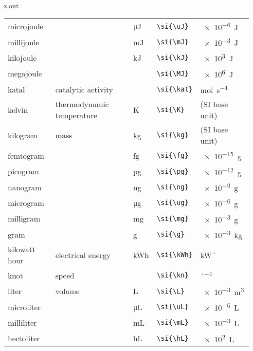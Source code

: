 \begin{VerbatimOut}{z.out}
{\begin{longtable}{@{}P{1.4in}P{1in}llP{1.8in}@{}}
    \quad microjoule&
      \ditto&
      \si{\uJ}&
      \verb+\si{\uJ}+&
      \SI{e-6}{\J}\\
    \quad millijoule&
      \ditto&
      \si{\mJ}&
      \verb+\si{\mJ}+&
      \SI{e-3}{\J}\\
    \quad kilojoule&
      \ditto&
      \si{\kJ}&
      \verb+\si{\kJ}+&
      \SI{e3}{\J}\\
    \quad megajoule&
      \ditto&
      \si{\MJ}&
      \verb+\si{\MJ}+&
      \SI{e6}{\J}\\
    \vsp
    katal&
      catalytic activity&
      \si{\kat}&
      \verb+\si{\kat}+&
      \si{\mol\per\s}\\
    \vsp
    kelvin&
      thermodynamic temperature&
      \si{\K}&
      \verb+\si{\K}+&
      (SI base unit)\\
    \vsp
    kilogram&
      mass&
      \si{\kg}&
      \verb+\si{\kg}+&
      (SI base unit)\\
    \quad femtogram&
      \ditto&
      \si{\fg}&
      \verb+\si{\fg}+&
      \SI{e-15}{\g}\\
    \quad picogram&
      \ditto&
      \si{\pg}&
      \verb+\si{\pg}+&
      \SI{e-12}{\g}\\
    \quad nanogram&
      \ditto&
      \si{\ng}&
      \verb+\si{\ng}+&
      \SI{e-9}{\g}\\
    \quad microgram&
      \ditto&
      \si{\ug}&
      \verb+\si{\ug}+&
      \SI{e-6}{\g}\\
    \quad milligram&
      \ditto&
      \si{\mg}&
      \verb+\si{\mg}+&
      \SI{e-3}{\g}\\
    \quad gram&
      \ditto&
      \si{\g}&
      \verb+\si{\g}+&
      \SI{e-3}{\kg}\\
    \vsp
    kilowatt hour&
      electrical energy&
      \si{\kWh}&
      \verb+\si{\kWh}+&
      \si{\kW\h}\\
    \vsp
    knot&
      speed&
      \si{\kn}&
      \verb+\si{\kn}+&
      \si{\M\per\h}\\
    \vsp
    liter&
      volume&
      \si{\L}&
      \verb+\si{\L}+&
      \SI{e-3}{m\cubed}\\
    \quad microliter&
      \ditto&
      \si{\uL}&
      \verb+\si{\uL}+&
      \SI{e-6}{\L}\\
    \quad milliliter&
      \ditto&
      \si{\mL}&
      \verb+\si{\mL}+&
      \SI{e-3}{\L}\\
    \quad hectoliter&
      \ditto&
      \si{\hL}&
      \verb+\si{\hL}+&
      \SI{e2}{\L}\\

\end{longtable}}
\end{VerbatimOut}

